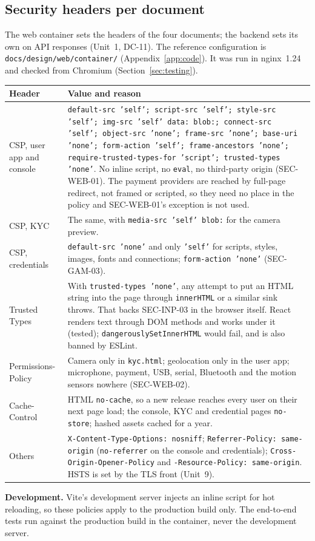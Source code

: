 \documentclass[11pt,a4paper]{article}
\newenvironment{dtable}[1]{\small\begin{longtable}{#1}}{\end{longtable}}
\begin{document}
\subsection{Security headers per document}
The web container sets the headers of the four documents; the backend sets its own on API responses (Unit~1, DC-11). The reference configuration is \texttt{docs/design/web/container/} (Appendix~\ref{app:code}). It was run in nginx~1.24 and checked from Chromium (Section~\ref{sec:testing}).
\begin{dtable}{@{}>{\raggedright\arraybackslash}p{2.6cm}>{\raggedright\arraybackslash}p{12.6cm}@{}}
\toprule
\textbf{Header} & \textbf{Value and reason} \\ \midrule \endhead
CSP, user app and console & \texttt{default-src 'self'; script-src 'self'; style-src 'self'; img-src 'self' data: blob:; connect-src 'self'; object-src 'none'; frame-src 'none'; base-uri 'none'; form-action 'self'; frame-ancestors 'none'; require-trusted-types-for 'script'; trusted-types 'none'}. No inline script, no \texttt{eval}, no third-party origin (SEC-WEB-01). The payment providers are reached by full-page redirect, not framed or scripted, so they need no place in the policy and SEC-WEB-01's exception is not used. \\
CSP, KYC & The same, with \texttt{media-src 'self' blob:} for the camera preview. \\
CSP, credentials & \texttt{default-src 'none'} and only \texttt{'self'} for scripts, styles, images, fonts and connections; \texttt{form-action 'none'} (SEC-GAM-03). \\
Trusted Types & With \texttt{trusted-types 'none'}, any attempt to put an HTML string into the page through \texttt{innerHTML} or a similar sink throws. That backs SEC-INP-03 in the browser itself. React renders text through DOM methods and works under it (tested); \texttt{dangerouslySetInnerHTML} would fail, and is also banned by ESLint. \\
Permissions-Policy & Camera only in \texttt{kyc.html}; geolocation only in the user app; microphone, payment, USB, serial, Bluetooth and the motion sensors nowhere (SEC-WEB-02). \\
Cache-Control & HTML \texttt{no-cache}, so a new release reaches every user on their next page load; the console, KYC and credential pages \texttt{no-store}; hashed assets cached for a year. \\
Others & \texttt{X-Content-Type-Options: nosniff}; \texttt{Referrer-Policy: same-origin} (\texttt{no-referrer} on the console and credentials); \texttt{Cross-Origin-Opener-Policy} and \texttt{-Resource-Policy: same-origin}. HSTS is set by the TLS front (Unit~9). \\
\bottomrule
\end{dtable}
\textbf{Development.} Vite's development server injects an inline script for hot reloading, so these policies apply to the production build only. The end-to-end tests run against the production build in the container, never the development server.
\end{document}
